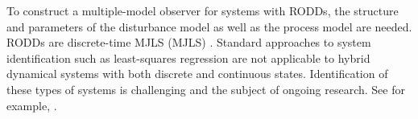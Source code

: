 {{To construct a multiple-model observer for systems with \gls{RODD}s, the structure and parameters of the disturbance model as well as the process model are needed. \gls{RODD}s are discrete-time \acrlong{MJLS} (\acrshort{MJLS}) \citep{costa_discrete-time_2005}. Standard approaches to system identification such as least-squares regression are not applicable to hybrid dynamical systems with both discrete and continuous states. Identification of these types of systems is challenging and the subject of ongoing research. See for example, \cite{piga_estimation_2020}.




}}
